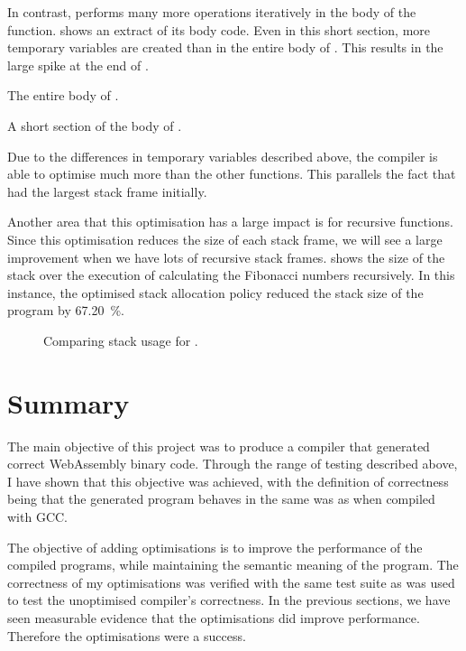 \documentclass[00-main.tex]{subfiles}
\begin{document}
In contrast,  performs many more operations iteratively in the body of the function.
 shows an extract of its body code.
Even in this short section, more temporary variables are created than in the entire body of .
This results in the large spike at the end of .

\begin{listing}[!ht]
  \caption{The entire body of .}
  \label{lst:caseupper body code}
\end{listing}

\begin{listing}[!ht]
  \caption{A short section of the body of .}
  \label{lst:section of casecamel body code}
\end{listing}

Due to the differences in temporary variables described above, the compiler is able to optimise  much more than the other functions.
This parallels the fact that  had the largest stack frame initially.


Another area that this optimisation has a large impact is for recursive functions.
Since this optimisation reduces the size of each stack frame, we will see a large improvement when we have lots of recursive stack frames.
 shows the size of the stack over the execution of calculating the Fibonacci numbers recursively.
In this instance, the optimised stack allocation policy reduced the stack size of the program by \SI{67.20}{\percent}.


\begin{figure}[ht]
  \centering
  \caption{Comparing stack usage for .}
  \label{fig:comparing stack usage for fibonacci.c}
\end{figure}



\section{Summary}

The main objective of this project was to produce a compiler that generated correct WebAssembly binary code.
Through the range of testing described above, I have shown that this objective was achieved, with the definition of correctness being that the generated program behaves in the same was as when compiled with GCC.

The objective of adding optimisations is to improve the performance of the compiled programs, while maintaining the semantic meaning of the program.
The correctness of my optimisations was verified with the same test suite as was used to test the unoptimised compiler's correctness.
In the previous sections, we have seen measurable evidence that the optimisations did improve performance.
Therefore the optimisations were a success.
\end{document}
